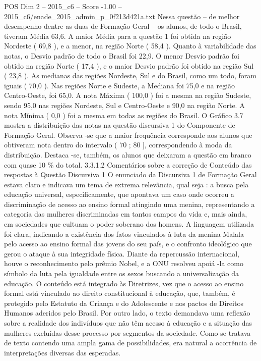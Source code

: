 \begin{textsample}{POS Dim 2 – 2015\_c6 – Score -1.00 – 2015\_c6/enade\_2015\_admin\_p\_0f213d421a.txt}
Nessa questão – de melhor desempenho dentre as duas de Formação Geral – os alunos, de todo o Brasil, tiveram Média 63,6.
A maior Média para a questão 1 foi obtida na região Nordeste ( 69,8 ), e a menor, na região Norte ( 58,4 ).
Quanto à variabilidade das notas, o Desvio padrão de todo o Brasil foi 22,9.
O menor Desvio padrão foi obtido na região Norte ( 17,4 ), e o maior Desvio padrão foi obtido na região Sul ( 23,8 ).
As medianas das regiões Nordeste, Sul e do Brasil, como um todo, foram iguais ( 70,0 ).
Nas regiões Norte e Sudeste, a Mediana foi 75,0 e na região Centro-Oeste, foi 65,0.
A nota Máxima ( 100,0 ) foi a mesma na região Sudeste, sendo 95,0 nas regiões Nordeste, Sul e Centro-Oeste e 90,0 na região Norte.
A nota Mínima ( 0,0 ) foi a mesma em todas as regiões do Brasil.
O Gráfico 3.7 mostra a distribuição das notas na questão discursiva 1 do Componente de Formação Geral.
Observa -se que a maior frequência corresponde aos alunos que obtiveram nota dentro do intervalo ( 70 ; 80 ], correspondendo à moda da distribuição.
Destaca -se, também, os alunos que deixaram a questão em branco com quase 10 \% do total. 3.3.1.2 Comentários sobre a correção de Conteúdo das respostas à Questão Discursiva 1 O enunciado da Discursiva 1 de Formação Geral estava claro e indicava um tema de extrema relevância, qual seja : a busca pela educação universal, especificamente, que apontava um caso onde ocorreu a discriminação de acesso ao ensino formal atingindo uma menina, representando a categoria das mulheres discriminadas em tantos campos da vida e, mais ainda, em sociedades que cultuam o poder soberano dos homens.
A linguagem utilizada foi clara, indicando a existência dos fatos vinculados à luta da menina Malala pelo acesso ao ensino formal das jovens do seu país, e o confronto ideológico que gerou o ataque à sua integridade física.
Diante da repercussão internacional, houve o reconhecimento pelo prêmio Nobel, e a ONU resolveu apoiá -la como símbolo da luta pela igualdade entre os sexos buscando a universalização da educação.
O conteúdo está integrado às Diretrizes, vez que o acesso ao ensino formal está vinculado ao direito constitucional à educação, que, também, é protegido pelo Estatuto da Criança e do Adolescente e nos pactos de Direitos Humanos aderidos pelo Brasil.
Por outro lado, o texto demandava uma reflexão sobre a realidade dos indivíduos que não têm acesso à educação e a situação das mulheres excluídas desse processo por segmentos da sociedade.
Como se tratava de texto contendo uma ampla gama de possibilidades, era natural a ocorrência de interpretações diversas das esperadas.

\end{textsample}
